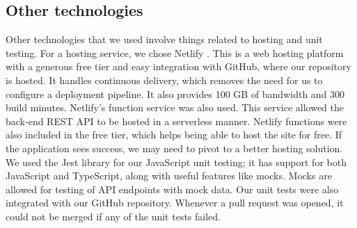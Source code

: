 \documentclass{article}
\begin{document}
\subsection{Other technologies}
\quad Other technologies that we used involve things related to hosting and unit testing. For a hosting service, we chose Netlify \cite{Netlify}. This is a web hosting platform with a generous free tier and easy integration with GitHub, where our repository is hosted. It handles continuous delivery, which removes the need for us to configure a deployment pipeline. It also provides 100 GB of bandwidth and 300 build minutes. Netlify's function service \cite{Netlify_functions} was also used. This service allowed the back-end REST API to be hosted in a serverless manner. Netlify functions were also included in the free tier, which helps being able to host the site for free. If the application sees success, we may need to pivot to a better hosting solution.  We used the Jest library for our JavaScript unit testing; it has support for both JavaScript and TypeScript, along with useful features like mocks. Mocks are allowed for testing of API endpoints with mock data. Our unit tests were also integrated with our GitHub repository. Whenever a pull request was opened, it could not be merged if any of the unit tests failed. 

\end{document}
